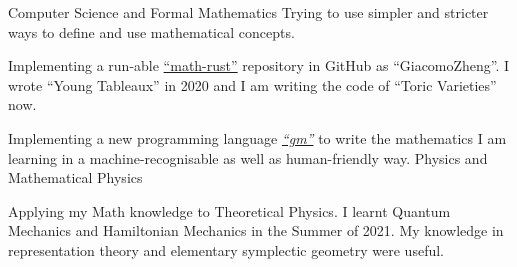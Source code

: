 \resumeSubHeadingListStart
	\resumeSubheading
		{Computer Science and Formal Mathematics}{}
		{Trying to use simpler and stricter ways to define and use mathematical concepts.}{}
		\resumeItemListStart
			\item Implementing a run-able \href{https://github.com/GiacomoZheng/math-rust}{``math-rust''} repository in GitHub as ``GiacomoZheng''. I wrote ``Young Tableaux'' in 2020 and I am writing the code of ``Toric Varieties'' now.
			\item Implementing a new programming language \href{https://github.com/GiacomoZheng/gm}{\textit{``gm''}} to write the mathematics I am learning in a machine-recognisable as well as human-friendly way.
		\resumeItemListEnd
	\resumeSubheadingPlain
		{Physics and Mathematical Physics}{}
		\resumeItemListStart
			\item Applying my Math knowledge to Theoretical Physics. I learnt Quantum Mechanics and Hamiltonian Mechanics in the Summer of 2021. My knowledge in representation theory and elementary symplectic geometry were useful.
		\resumeItemListEnd
\resumeSubHeadingListEnd

